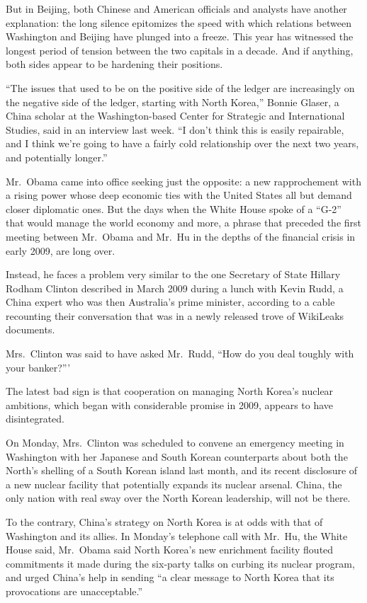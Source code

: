 ﻿\documentclass[12pt]{article}
\begin{document}
But in Beijing, both Chinese and American officials and analysts have another explanation: the long
silence epitomizes the speed with which relations between Washington and Beijing have plunged into a
freeze. This year has witnessed the longest period of tension between the two capitals in a decade.
And if anything, both sides appear to be hardening their positions.

``The issues that used to be on the positive side of the ledger are increasingly on the negative
side of the ledger, starting with North Korea,'' Bonnie Glaser, a China scholar at the
Washington-based Center for Strategic and International Studies, said in an interview last week. ``I
don't think this is easily repairable, and I think we're going to have a fairly cold relationship
over the next two years, and potentially longer.''

Mr.~Obama came into office seeking just the opposite: a new rapprochement with a rising power whose
deep economic ties with the United States all but demand closer diplomatic ones. But the days when
the White House spoke of a ``G-2'' that would manage the world economy and more, a phrase that
preceded the first meeting between Mr.~Obama and Mr.~Hu in the depths of the financial crisis in
early 2009, are long over.

Instead, he faces a problem very similar to the one Secretary of State Hillary Rodham Clinton
described in March 2009 during a lunch with Kevin Rudd, a China expert who was then Australia's
prime minister, according to a cable recounting their conversation that was in a newly released
trove of WikiLeaks documents.

Mrs.~Clinton was said to have asked Mr.~Rudd, ``How do you deal toughly with your banker?'''

The latest bad sign is that cooperation on managing North Korea's nuclear ambitions, which began
with considerable promise in 2009, appears to have disintegrated.

On Monday, Mrs.~Clinton was scheduled to convene an emergency meeting in Washington with her
Japanese and South Korean counterparts about both the North's shelling of a South Korean island last
month, and its recent disclosure of a new nuclear facility that potentially expands its nuclear
arsenal. China, the only nation with real sway over the North Korean leadership, will not be there.

To the contrary, China's strategy on North Korea is at odds with that of Washington and its allies.
In Monday's telephone call with Mr.~Hu, the White House said, Mr.~Obama said North Korea's new
enrichment facility flouted commitments it made during the six-party talks on curbing its nuclear
program, and urged China's help in sending ``a clear message to North Korea that its provocations
are unacceptable.''
\end{document}
